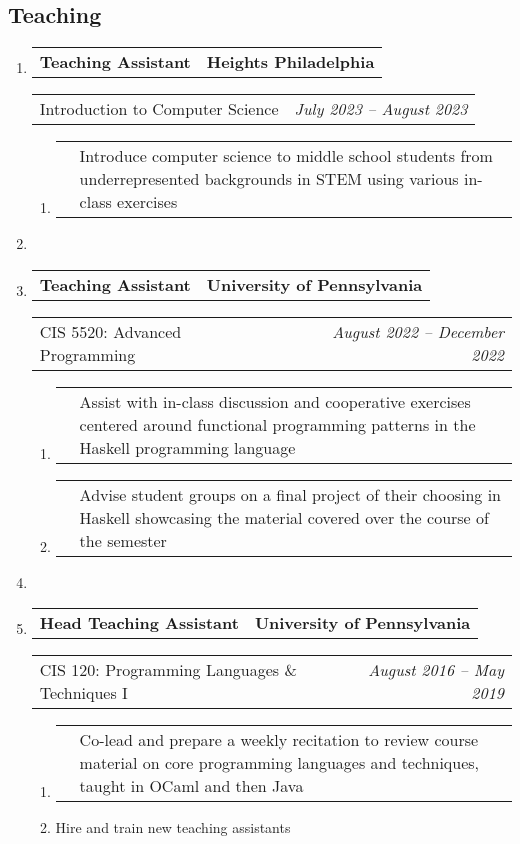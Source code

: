 \documentclass[letterpaper]{article}
\makeatletter
\newcommand*{\tabulardef}[3]{\begin{tabular}[t]{@{}lp{\dimexpr\linewidth-#1}@{}}
    #2&#3
\end{tabular}}
\newcommand{\headerrow}[2]
{\begin{tabular*}{\linewidth}{l@{\extracolsep{\fill}}r}
	#1 &
	#2 \\
\end{tabular*}}
\makeatother
\begin{document}
\subsection*{Teaching}
\begin{enumerate}[label=]
	\parskip=-0.25em

    \item
		\headerrow
			{\textbf{Teaching Assistant}}
			{\textbf{Heights Philadelphia}}
	\headerrow
		{Introduction to Computer Science}
		{\emph{July 2023 -- August 2023}}
	\begin{enumerate}[label= *]
		\parskip=-0.1em
    \item\tabulardef{5cm}{}{Introduce computer science to middle school students from underrepresented backgrounds in STEM using various in-class exercises}
	\end{enumerate}

    \item

	\item
		\headerrow
			{\textbf{Teaching Assistant}}
			{\textbf{University of Pennsylvania}}
	\headerrow
		{CIS 5520: Advanced Programming}
		{\emph{August 2022 -- December 2022}}
	\begin{enumerate}[label= *]
		\parskip=-0.1em
        \item\tabulardef{5cm}{}{Assist with in-class discussion and cooperative exercises centered around functional programming patterns in the Haskell programming language}        
        \item\tabulardef{5cm}{}{Advise student groups on a final project of their choosing in Haskell showcasing the material covered over the course of the semester}
	\end{enumerate}

     \item

	\item
		\headerrow
			{\textbf{Head Teaching Assistant}}
			{\textbf{University of Pennsylvania}}
	\headerrow
		{CIS 120: Programming Languages \& Techniques I}
		{\emph{August 2016 -- May 2019}}
	\begin{enumerate}[label= *]
		\parskip=-0.1em
        \item\tabulardef{5cm}{}{Co-lead and prepare a weekly recitation to review course material on core programming languages and techniques, taught in OCaml and then Java}
		\item Hire and train new teaching assistants
	\end{enumerate}
\end{enumerate}
\end{document}
